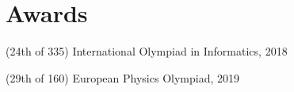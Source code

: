 \documentclass[letterpaper,11pt]{article}
\begin{document}
\section*{Awards}
\begin{description}[labelwidth=6.25em]
    \item[Gold medal] (24th of 335) International Olympiad in Informatics, 2018
    \item[Silver medal] (29th of 160) European Physics Olympiad, 2019
\end{description}
\end{document}
